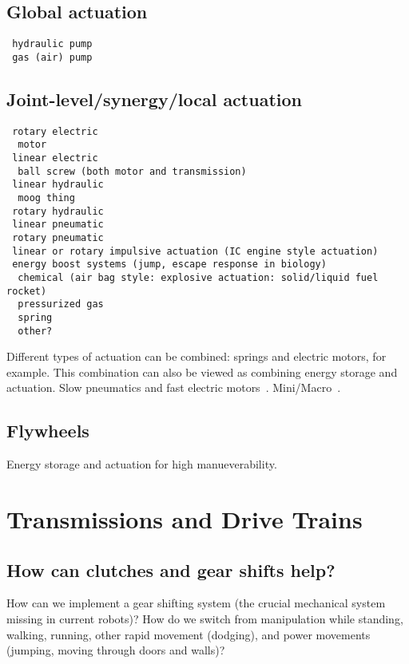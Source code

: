 \documentclass[letterpaper,12pt,fullpage]{article}
\begin{document}
\subsection{Global actuation}

\begin{verbatim}
 hydraulic pump 
 gas (air) pump
\end{verbatim}

\subsection{Joint-level/synergy/local actuation}

\begin{verbatim}
 rotary electric
  motor
 linear electric
  ball screw (both motor and transmission)
 linear hydraulic
  moog thing
 rotary hydraulic
 linear pneumatic
 rotary pneumatic
 linear or rotary impulsive actuation (IC engine style actuation)
 energy boost systems (jump, escape response in biology)
  chemical (air bag style: explosive actuation: solid/liquid fuel rocket)
  pressurized gas
  spring
  other?
\end{verbatim}

Different types of actuation can be combined: springs and electric motors,
for example. This combination can also be viewed as combining energy
storage and actuation. Slow pneumatics and fast electric motors~\cite{Morimoto,UCLA}.
Mini/Macro~\cite{Stanford}.

\subsection{Flywheels}

Energy storage and actuation for high manueverability.

\section{Transmissions and Drive Trains}

\subsection{How can clutches and gear shifts help?}

How can we implement a gear shifting system (the crucial mechanical
system missing in current robots)? How do we switch from manipulation
while standing, walking, running, other rapid movement (dodging), and
power movements (jumping, moving through doors and walls)?
\end{document}
